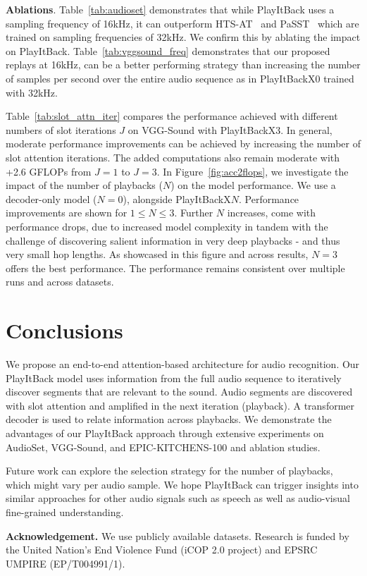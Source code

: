 \documentclass{article}
\begin{document}
\noindent
\textbf{Ablations}. 
Table~\ref{tab:audioset} demonstrates that while PlayItBack uses a sampling frequency of 16kHz, it can outperform HTS-AT~\cite{chen2022hts} and PaSST~\cite{koutini2021efficient} which are trained on sampling frequencies of 32kHz.
We confirm this by ablating the impact on PlayItBack.
Table~\ref{tab:vggsound_freq} demonstrates that our proposed replays at 16kHz, can be a better performing strategy than increasing the number of samples per second over the entire audio sequence as in PlayItBackX0 trained with 32kHz.

Table~\ref{tab:slot_attn_iter} compares the performance achieved with different numbers of slot iterations $J$ on VGG-Sound with PlayItBackX3. In general, moderate performance improvements can be achieved by increasing the number of slot attention iterations. The added computations also remain moderate with +2.6 GFLOPs from $J=1$ to $J=3$. In Figure~\ref{fig:acc2flops}, we investigate the impact of the number of playbacks ($N$) on the model performance. We use a decoder-only model ($N=0$), alongside PlayItBackX$N$. 
Performance improvements are shown for $1 \le N \! \le \! 3$. 
Further $N$ increases, come with performance drops, due to increased model complexity in tandem with the challenge of discovering salient information in very deep playbacks - and thus very small hop lengths.
As showcased in this figure and across results, $N=3$ offers the best performance.
The performance remains consistent over multiple runs and across datasets.


\section{Conclusions}
\vspace*{-6pt}
We propose an end-to-end attention-based architecture for audio recognition. Our PlayItBack model uses information from the full audio sequence to iteratively discover segments that are relevant to the sound. Audio segments are discovered with slot attention and amplified in the next iteration (playback). A transformer decoder is used to relate information across playbacks. 
We demonstrate the advantages of our PlayItBack approach through extensive experiments on AudioSet, VGG-Sound, and EPIC-KITCHENS-100 and ablation studies. 

Future work can explore the selection strategy for the number of playbacks, which might vary per audio sample. We hope PlayItBack can trigger insights into similar approaches for other audio signals such as speech as well as audio-visual fine-grained understanding.


\vspace*{6pt}
\noindent \textbf{Acknowledgement.} 
We use publicly available datasets.
Research is funded by the United Nation’s End Violence Fund (iCOP 2.0 project) and EPSRC UMPIRE (EP/T004991/1).

\vfill\pagebreak




\end{document}
